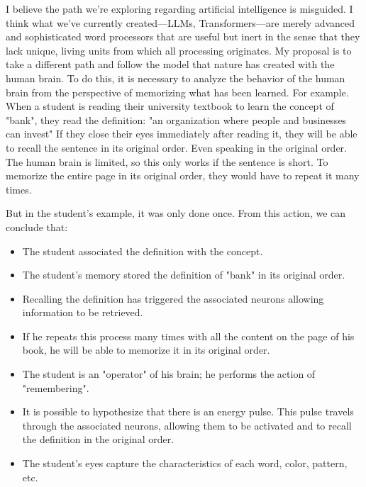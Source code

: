 \documentclass[12pt]{article}
\begin{document}
I believe the path we're exploring regarding artificial intelligence is misguided. I think what we've currently created—LLMs, Transformers—are merely advanced and sophisticated word processors that are useful but inert in the sense that they lack unique, living units from which all processing originates. My proposal is to take a different path and follow the model that nature has created with the human brain.
To do this, it is necessary to analyze the behavior of the human brain from the perspective of memorizing what has been learned. For example. When a student is reading their university textbook to learn the concept of "bank", they read the definition: "an organization where people and businesses can invest" If they close their eyes immediately after reading it, they will be able to recall the sentence in its original order. Even speaking in the original order. The human brain is limited, so this only works if the sentence is short. To memorize the entire page in its original order, they would have to repeat it many times.

But in the student's example, it was only done once. From this action, we can conclude that:
\begin{itemize}
\item The student associated the definition with the concept.

\item The student's memory stored the definition of "bank" in its original order.

\item Recalling the definition has triggered the associated neurons allowing information to be retrieved.

\item If he repeats this process many times with all the content on the page of his book, he will be able to memorize it in its original order.

\item The student is an "operator" of his brain; he performs the action of "remembering".

\item It is possible to hypothesize that there is an energy pulse. This pulse travels through the associated neurons, allowing them to be activated and to recall the definition in the original order.

\item The student's eyes capture the characteristics of each word, color, pattern, etc.
\end{itemize}
\end{document}
